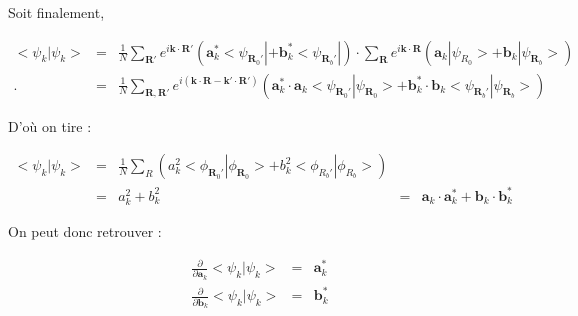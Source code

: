 Soit finalement,

\begin{eqnarray*}
    <\psi_k | \psi_k> & = & \frac{1}{N} \sum_{\mathbf{R}'}
    e^{i\mathbf{k}\cdot\mathbf{R}'} (\mathbf{a}_k^* <\psi_{\mathbf{R}_0'}| +
    \mathbf{b}_k^* <\psi_{\mathbf{R}_b'}|) \cdot \sum_\mathbf{R}
    e^{i\mathbf{k}\cdot \mathbf{R}} (\mathbf{a}_k |\psi_{R_0}> + \mathbf{b}_k |
    \psi_{\mathbf{R}_b}>) \\
    . & = & \frac{1}{N} \sum_{\mathbf{R,R}'}
    e^{i(\mathbf{k}\cdot\mathbf{R}-\mathbf{k}'\cdot\mathbf{R}')}
    (\mathbf{a}_k^*\cdot\mathbf{a}_k <\psi_{\mathbf{R}_0'}|\psi_{\mathbf{R}_0}> +
    \mathbf{b}_k^* \cdot\mathbf{b}_k <\psi_{\mathbf{R}_b'}|\psi_{\mathbf{R}_b}>)
\end{eqnarray*}

D'où on tire :

\begin{align}
    <\psi_k|\psi_k> & = &\frac{1}{N} \sum_R (a_k^2 <\phi_{\mathbf{R}_0'} |
    \phi_{\mathbf{R}_0}> + b_k^2 <\phi_{R_b'}|\phi_{R_b}>)\\
    & = & a_k^2 + b_k^2
    & = & \mathbf{a}_k\cdot\mathbf{a}_k^* + \mathbf{b}_k\cdot\mathbf{b}_k^*
\end{align}

On peut donc retrouver :

\begin{eqnarray}
    \frac{\partial}{\partial \mathbf{a}_k} <\psi_k|\psi_k> & = & \mathbf{a}_k^* \\
    \frac{\partial}{\partial \mathbf{b}_k} <\psi_k|\psi_k> & = & \mathbf{b}_k^*
\end{eqnarray}

\TODO
